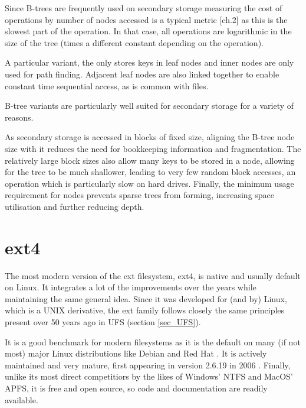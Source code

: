         Since B-trees are frequently used on secondary storage measuring the
        cost of operations by number of nodes accessed is a typical metric
        \cite{btree_ubiquitous}[ch.2] as this is the slowest part of the
        operation. In that case, all operations are logarithmic in the size of
        the tree (times a different constant depending on the operation).

        A particular variant, the \bplustree only stores keys in leaf nodes and
        inner nodes are only used for path finding. Adjacent leaf nodes are
        also linked together to enable constant time sequential access, as is
        common with files.

        B-tree variants are particularly well suited for secondary storage for
        a variety of reasons.

        As secondary storage is accessed in blocks of fixed size, aligning the
        B-tree node size with it reduces the need for bookkeeping information
        and fragmentation. The relatively large block sizes also allow many
        keys to be stored in a node, allowing for the tree to be much
        shallower, leading to very few random block accesses, an operation
        which is particularly slow on hard drives. Finally, the minimum usage
        requirement for nodes prevents sparse trees from forming, increasing
        space utilisation and further reducing depth.

    \section{ext4}
        \label{sec_ext4}

        The most modern version of the ext filesystem, ext4, is native and
        usually default on Linux. It integrates a lot of the improvements over
        the years while maintaining the same general idea. Since it was
        developed for (and by) Linux, which is a UNIX derivative, the ext
        family follows closely the same principles present over 50 years ago in
        UFS (section \ref{sec_UFS}).

        It is a good benchmark for modern filesystems as it is the default on
        many (if not most) major Linux distributions like Debian
        \cite{Debian_filesystem} and Red Hat \cite{RedHat_filesystem}.  It is
        actively maintained \cite{ext4_mailing_list} and very mature, first
        appearing in version 2.6.19 in 2006 \cite{ext4_origin}.  Finally,
        unlike its most direct competitiors by the likes of Windows' NTFS and
        MacOS' APFS, it is free and open source, so code and documentation are
        readily available.

